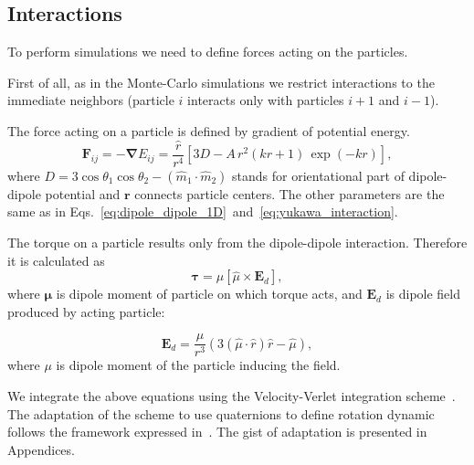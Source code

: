 \subsection{Interactions}

To perform simulations we need to define forces acting on the particles.

First of all, as in the Monte-Carlo simulations we restrict interactions to the immediate neighbors (particle $i$ interacts only with particles $i+1$ and $i-1$).

The force acting on a particle is defined by gradient of potential energy.
\begin{equation}
\label{eq:full_force}
	\boldsymbol{F}_{ij}
		= -\boldsymbol{\nabla} E_{ij}
		=  \frac{\hat{r}}{r^4} \left[3 D - A\, r^2 (k r +1) \, \exp(-k r) \right],
\end{equation}
where $D = 3 \cos \theta_1 \cos \theta_2 - (\hat{m}_1 \cdot \hat{m}_2)$ stands for orientational part of dipole-dipole potential and $\boldsymbol{r}$ connects particle centers. The other parameters are the same as in Eqs.~\eqref{eq:dipole_dipole_1D}~and~\eqref{eq:yukawa_interaction}.

The torque on a particle results only from the dipole-dipole interaction. Therefore it is calculated as
\begin{equation}
\label{eq:dipole_torque}
	\boldsymbol{\tau}  = \mu[\hat{\mu} \times \boldsymbol{E}_d ],
\end{equation}
where $\boldsymbol{\mu}$ is dipole moment of particle on which torque acts, and $\boldsymbol{E}_d$ is dipole field produced by acting particle:

\begin{equation}
\label{eq:dipole_field}
	\boldsymbol{E}_d = \frac{\mu}{r^3}
		\left(3 (\hat{\mu} \cdot \hat{r}) \hat{r} - \hat{\mu} \right),
\end{equation}
where $\mu$ is dipole moment of the particle inducing the field.

We integrate the above equations using the Velocity-Verlet integration scheme~\cite{Taylor2013}. The adaptation of the scheme to use quaternions to define rotation dynamic follows the framework expressed in~\cite{Zhao2013}. The gist of adaptation is presented in Appendices.

